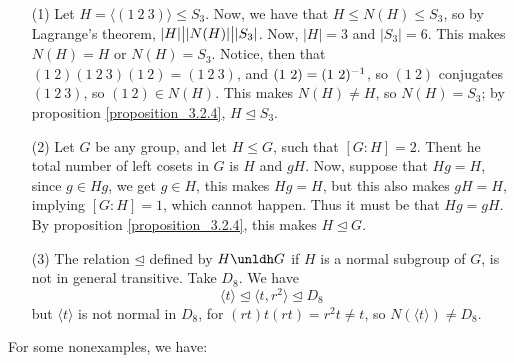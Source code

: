 \begin{example}\label{example_3.5}
  \begin{enumerate}
    \item[(1)] Let $H=\langle (1 \ 2 \ 3) \rangle \leq S_3$. Now, we have that
      $H \leq N(H) \leq S_3$, so by Lagrange's theorem, $|H| \big{|}
      |N(H)| \big{|} |S_3|$. Now, $|H|=3$ and $|S_3|=6$.
      This makes $N(H)=H$ or $N(H)=S_3$. Notice, then that $(1 \ 2)(1 \ 2
      \ 3)(1 \ 2)=(1 \ 2 \ 3)$, and $(1 \ 2)=(1 \ 2)^{-1}$, so $(1 \ 2)$
      conjugates $(1 \ 2 \ 3)$, so $(1 \ 2) \in N(H)$. This makes $N(H)
      \neq H$, so $N(H)=S_3$; by proposition \ref{proposition_3.2.4}, $H \unlhd S_3$.

    \item[(2)] Let $G$ be any group, and let  $H \leq G$, such that
      $[G:H]=2$. Thent he total number of left cosets in $G$ is  $H$ and
      $gH$. Now, suppose that  $Hg=H$, since $g \in Hg$, we get $g \in H$,
      this makes  $Hg=H$, but this also makes $gH=H$, implying  $[G:H]=1$,
      which cannot happen. Thus it must be that $Hg=gH$. By proposition
      \ref{proposition_3.2.4}, this makes $H \unlhd G$.

    \item[(3)] The relation $\unlhd$ defined by $H \unldh G$ if  $H$ is a
      normal subgroup of  $G$, is not in general transitive. Take $D_8$.
      We have
      \begin{equation*}
        \langle t \rangle \unlhd \langle t,r^2 \rangle \unlhd D_8
      \end{equation*}
      but $\langle t \rangle$ is not normal in $ D_8$, for $(rt)t(rt)=r^2t \neq
      t$, so $N(\langle t \rangle) \neq D_8$.
  \end{enumerate}
\end{example}

For some nonexamples, we have:

